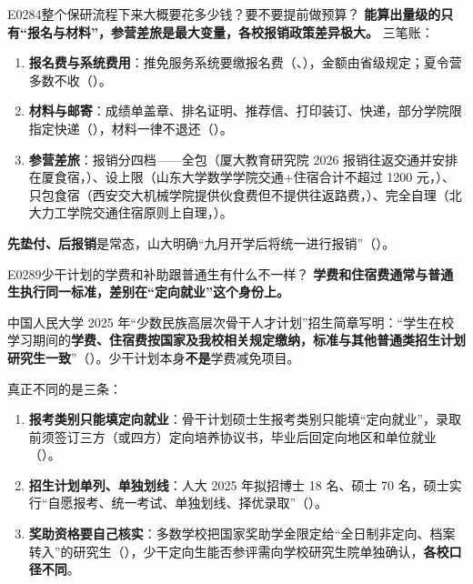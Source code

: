 \begin{qa}{E0284}{整个保研流程下来大概要花多少钱？要不要提前做预算？}
\textbf{能算出量级的只有“报名与材料”，参营差旅是最大变量，各校报销政策差异极大。} 三笔账：

\begin{enumerate}
  \item \textbf{报名费与系统费用}：推免服务系统要缴报名费（、），金额由省级规定；夏令营多数不收（）。
  \item \textbf{材料与邮寄}：成绩单盖章、排名证明、推荐信、打印装订、快递，部分学院限指定快递（），材料一律不退还（）。
  \item \textbf{参营差旅}：报销分四档——全包（厦大教育研究院 2026 报销往返交通并安排在厦食宿，）、设上限（山东大学数学学院交通+住宿合计不超过 1200 元，）、只包食宿（西安交大机械学院提供伙食费但不提供往返路费，）、完全自理（北大力工学院交通住宿原则上自理，）。
\end{enumerate}

\textbf{先垫付、后报销}是常态，山大明确“九月开学后将统一进行报销”（）。
\end{qa}

\begin{qa}{E0289}{少干计划的学费和补助跟普通生有什么不一样？}
\textbf{学费和住宿费通常与普通生执行同一标准，差别在“定向就业”这个身份上。}

中国人民大学 2025 年“少数民族高层次骨干人才计划”招生简章写明：“学生在校学习期间的\textbf{学费、住宿费按国家及我校相关规定缴纳，标准与其他普通类招生计划研究生一致}”（）。少干计划本身\textbf{不是}学费减免项目。

真正不同的是三条：

\begin{enumerate}
  \item \textbf{报考类别只能填定向就业}：骨干计划硕士生报考类别只能填“定向就业”，录取前须签订三方（或四方）定向培养协议书，毕业后回定向地区和单位就业（）。
  \item \textbf{招生计划单列、单独划线}：人大 2025 年拟招博士 18 名、硕士 70 名，硕士实行“自愿报考、统一考试、单独划线、择优录取”（）。
  \item \textbf{奖助资格要自己核实}：多数学校把国家奖助学金限定给“全日制非定向、档案转入”的研究生（），少干定向生能否参评需向学校研究生院单独确认，\textbf{各校口径不同}。
\end{enumerate}
\end{qa}

